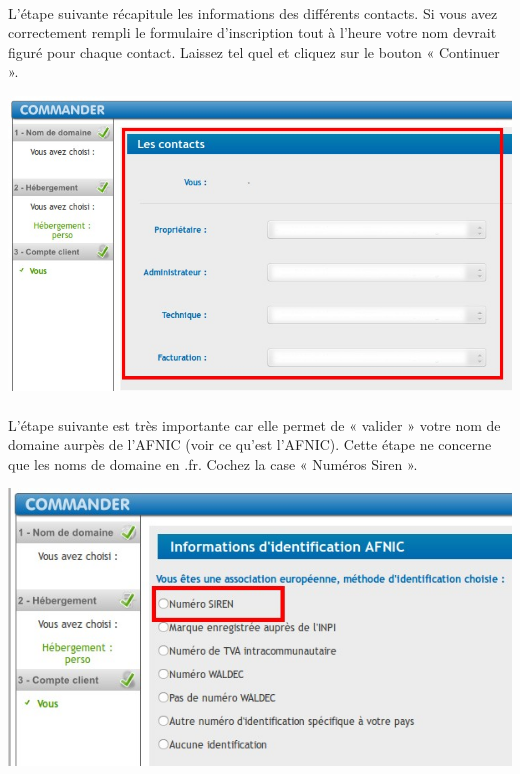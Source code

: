\documentclass[10pt,a4paper]{article}
\begin{document}
\paragraph{}L'étape suivante récapitule les informations des différents contacts. Si vous avez correctement rempli le formulaire d'inscription tout à l'heure votre nom devrait figuré pour chaque contact. Laissez tel quel et cliquez sur le bouton « Continuer ».
\begin{center}
\includegraphics[scale=0.3]{img/0282.png}
\end{center}
\paragraph{}L'étape suivante est très importante car elle permet de « valider » votre nom de domaine aurpès de l'AFNIC (voir ce qu'est l'AFNIC). Cette étape ne concerne que les noms de domaine en .fr. Cochez la case « Numéros Siren ».
\begin{center}
\includegraphics[scale=0.3]{img/0283.png}
\end{center}
\newpage
\end{document}
